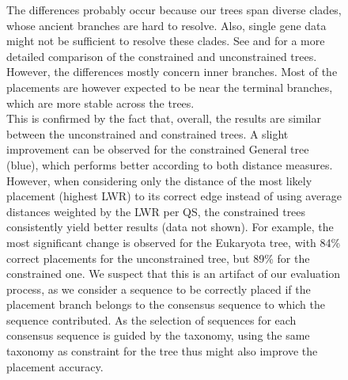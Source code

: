 \begin{figure}[hpbt]
{        The differences probably occur because our trees span diverse clades,
        whose ancient branches are hard to resolve. %
        Also, single gene data might not be sufficient to resolve these clades.
        See  and 
        for a more detailed comparison of the constrained and unconstrained trees.
        However, the differences mostly concern inner branches.
        Most of the placements are however expected to be near the terminal branches,
        which are more stable across the trees.
        \\
        This is confirmed by the fact that, overall,
        the results are similar between the unconstrained and constrained trees.
        A slight improvement can be observed for the constrained General tree (blue),
        which performs better according to both distance measures.
        However, when considering only the distance of the most likely placement (highest \ac{LWR}) to its correct edge
        instead of using average distances weighted by the \ac{LWR} per \ac{QS},
        the constrained trees consistently yield better results (data not shown).
        For example, the most significant change is observed for the Eukaryota tree,
        with 84\% correct placements for the unconstrained tree, but 89\% for the constrained one.
        We suspect that this is an artifact of our evaluation process,
        as we consider a sequence to be correctly placed if the placement branch belongs to the consensus sequence
        to which the sequence contributed.
        As the selection of sequences for each consensus sequence is guided by the taxonomy,
        using the same taxonomy as constraint for the tree thus might also improve the placement accuracy.
    }
    \label{fig:constraints_backbone}
\end{figure}

%
%
%
%
%
%

